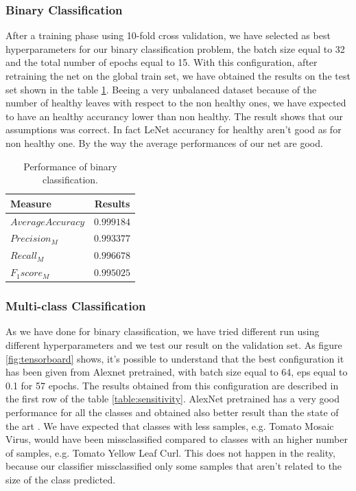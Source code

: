 \subsubsection{Binary Classification}
After a training phase using 10-fold cross validation, we have selected as best hyperparameters for our binary classification problem, the batch size equal to 32 and the total number of epochs equal to 15. With this configuration, after retraining the net on the global train set, we have obtained the results on the test set shown in the table \ref{table:binary}. Beeing a very unbalanced dataset because of the number of healthy leaves with respect to the non healthy ones, we have expected to have an healthy accurancy lower than non healthy. The result shows that our assumptions was correct. In fact LeNet accurancy for healthy aren't good as for non healthy one. By the way the average performances of our net are good.
\begin{table}[H]
	\begin{center}
		\begin{tabular}{|l|c|}
			\hline
			\textbf{Measure} & \textbf{Results} \\ 
			\hline
			$Average Accuracy$ & $0.999184$ \\
			$Precision_M$ & $0.993377$ \\
			$Recall_M$ & $0.996678$ \\
			$F_1 score_M$ & $0.995025$ \\
			\hline
		\end{tabular}
	\end{center}
	\caption{Performance of binary classification.}
	\label{table:binary}
\end{table}
\subsubsection{Multi-class Classification}
As we have done for binary classification, we have tried different run using different hyperparameters and we test our result on the validation set. As figure \ref{fig:tensorboard} shows, it's possible to understand that the best configuration it has been given from Alexnet pretrained, with batch size equal to 64, eps equal to 0.1 for 57 epochs. The results obtained from this configuration are described in the first row of the table \ref{table:sensitivity}. AlexNet pretrained has a very good performance for all the classes and obtained also better result than the state of the art \cite{ref11}. We have expected that classes with less samples, e.g. Tomato Mosaic Virus, would have been missclassified compared to classes with an higher number of samples, e.g. Tomato Yellow Leaf Curl. This does not happen in the reality, because our classifier missclassified only some samples that aren't related to the size of the class predicted.
